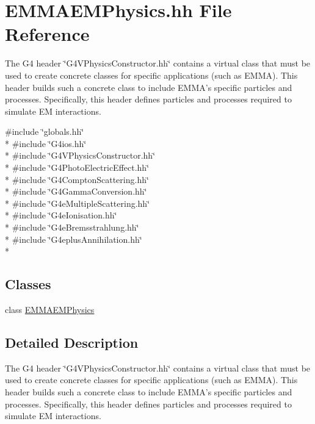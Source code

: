 \hypertarget{EMMAEMPhysics_8hh}{\section{E\-M\-M\-A\-E\-M\-Physics.\-hh File Reference}
\label{EMMAEMPhysics_8hh}
}


The G4 header \char`\"{}\-G4\-V\-Physics\-Constructor.\-hh\char`\"{} contains a virtual class that must be used to create concrete classes for specific applications (such as E\-M\-M\-A). This header builds such a concrete class to include E\-M\-M\-A's specific particles and processes. Specifically, this header defines particles and processes required to simulate E\-M interactions.  


{\ttfamily \#include \char`\"{}globals.\-hh\char`\"{}}\\*
{\ttfamily \#include \char`\"{}G4ios.\-hh\char`\"{}}\\*
{\ttfamily \#include \char`\"{}G4\-V\-Physics\-Constructor.\-hh\char`\"{}}\\*
{\ttfamily \#include \char`\"{}G4\-Photo\-Electric\-Effect.\-hh\char`\"{}}\\*
{\ttfamily \#include \char`\"{}G4\-Compton\-Scattering.\-hh\char`\"{}}\\*
{\ttfamily \#include \char`\"{}G4\-Gamma\-Conversion.\-hh\char`\"{}}\\*
{\ttfamily \#include \char`\"{}G4e\-Multiple\-Scattering.\-hh\char`\"{}}\\*
{\ttfamily \#include \char`\"{}G4e\-Ionisation.\-hh\char`\"{}}\\*
{\ttfamily \#include \char`\"{}G4e\-Bremsstrahlung.\-hh\char`\"{}}\\*
{\ttfamily \#include \char`\"{}G4eplus\-Annihilation.\-hh\char`\"{}}\\*
\subsection*{Classes}
\begin{DoxyCompactItemize}
\item 
class \hyperlink{classEMMAEMPhysics}{E\-M\-M\-A\-E\-M\-Physics}
\end{DoxyCompactItemize}


\subsection{Detailed Description}
The G4 header \char`\"{}\-G4\-V\-Physics\-Constructor.\-hh\char`\"{} contains a virtual class that must be used to create concrete classes for specific applications (such as E\-M\-M\-A). This header builds such a concrete class to include E\-M\-M\-A's specific particles and processes. Specifically, this header defines particles and processes required to simulate E\-M interactions. 